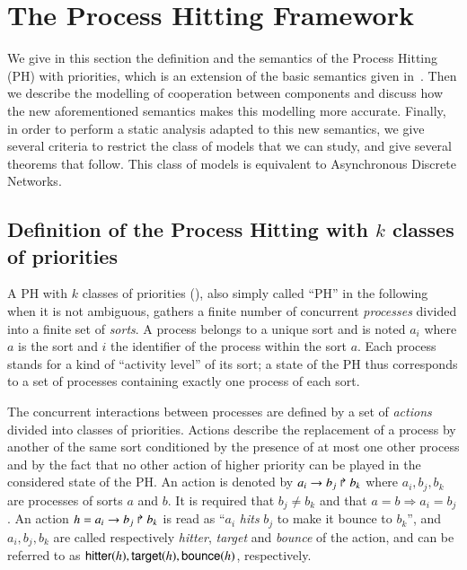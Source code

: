 \section{The Process Hitting Framework}

We give in this section the definition and the semantics of the Process Hitting (PH) with priorities, which is an extension of the basic semantics given in~\cite{PMR10-TCSB}.
Then we describe the modelling of cooperation between components and discuss how the new aforementioned semantics makes this modelling more accurate.
Finally, in order to perform a static analysis adapted to this new semantics, we give several criteria to restrict the class of models that we can study,
and give several theorems that follow.
This class of models is equivalent to Asynchronous Discrete Networks.

\subsection{Definition of the Process Hitting with $k$ classes of priorities}
\label{ssec:PH}
A PH with $k$ classes of priorities (), also simply called “PH” in the following when it is not ambiguous, gathers a finite number of concurrent \emph{processes} divided into a finite set of \emph{sorts}.
A process belongs to a unique sort and is noted $a_i$ where $a$ is the sort and $i$ the identifier of the process within the sort $a$.
Each process stands for a kind of “activity level” of its sort; a state of the PH thus corresponds to a set of processes containing exactly one process of each sort.

The concurrent interactions between processes are defined by a set of \emph{actions} divided into classes of priorities.
Actions describe the replacement of a process by another of the same sort conditioned by the presence of at most one other process and by the fact that no other action of higher priority can be played in the considered state of the PH.
An action is denoted by $a_i\rightarrow b_j\Rsh b_k$ where $a_i,b_j,b_k$ are processes of sorts $a$ and $b$.
It is required that $b_j \neq b_k$ and that $a=b\Rightarrow a_i=b_j$.
An action $h=a_i\rightarrow b_j\Rsh b_k$ is read as ``$a_i$ \emph{hits} $b_j$ to make it bounce to $b_k$'', and $a_i,b_j,b_k$ are called respectively \emph{hitter}, \emph{target} and \emph{bounce} of the action, and can be referred to as $\mathsf{hitter}(h), \mathsf{target}(h), \mathsf{bounce}(h)$, respectively.

